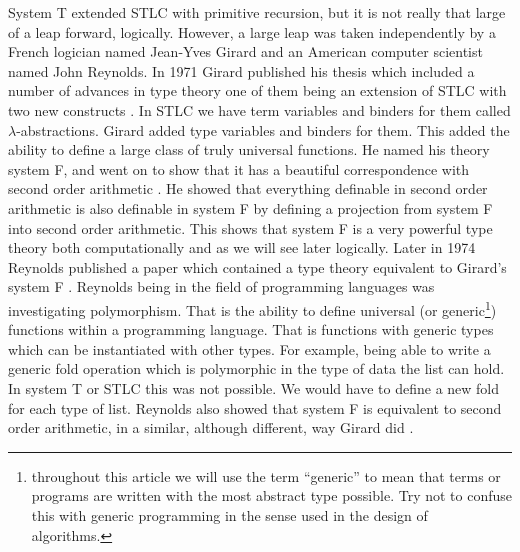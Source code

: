 System T extended STLC with primitive recursion, but it is not really
that large of a leap forward, logically.  However, a large leap was
taken independently by a French logician named Jean-Yves Girard and an
American computer scientist named John Reynolds.  In 1971 Girard
published his thesis which included a number of advances in type
theory one of them being an extension of STLC with two new constructs
\cite{Girard:1971,Girard:1989,Barendregt:1992}.  In STLC we have term
variables and binders for them called $\lambda$-abstractions.  Girard
added type variables and binders for them.  This added the ability to
define a large class of truly universal functions. He named his theory
system F, and went on to show that it has a beautiful correspondence
with second order arithmetic \cite{Wadler:2007}.  He showed that
everything definable in second order arithmetic is also definable in
system F by defining a projection from system F into second order
arithmetic.  This shows that system F is a very powerful type theory
both computationally and as we will see later logically.  Later in
1974 Reynolds published a paper which contained a type theory
equivalent to Girard's system F \cite{Reynolds:1974,Reynolds:1998}.
Reynolds being in the field of programming languages was investigating
polymorphism.  That is the ability to define universal (or
generic\footnote{ throughout this article we will use the term
  ``generic'' to mean that terms or programs are written with the most
  abstract type possible.  Try not to confuse this with generic
  programming in the sense used in the design of algorithms.})
functions within a programming language.  That is functions with
generic types which can be instantiated with other types. For example,
being able to write a generic fold operation which is polymorphic in
the type of data the list can hold.  In system T or STLC this was not
possible.  We would have to define a new fold for each type of list.
Reynolds also showed that system F is equivalent to second order
arithmetic, in a similar, although different, way Girard did
\cite{Wadler:2007}.


